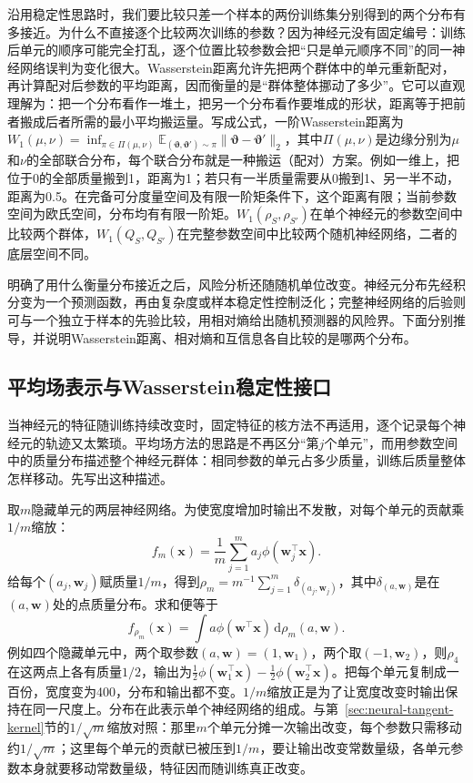 沿用稳定性思路时，我们要比较只差一个样本的两份训练集分别得到的两个分布有多接近。为什么不直接逐个比较两次训练的参数？因为神经元没有固定编号：训练后单元的顺序可能完全打乱，逐个位置比较参数会把“只是单元顺序不同”的同一神经网络误判为变化很大。Wasserstein距离允许先把两个群体中的单元重新配对，再计算配对后参数的平均距离，因而衡量的是“群体整体挪动了多少”。它可以直观理解为：把一个分布看作一堆土，把另一个分布看作要堆成的形状，距离等于把前者搬成后者所需的最小平均搬运量。写成公式，一阶Wasserstein距离为$W_1(\mu,\nu)=\inf_{\pi\in\Pi(\mu,\nu)}\mathbb E_{(\bm\vartheta,\bm\vartheta')\sim\pi}\|\bm\vartheta-\bm\vartheta'\|_2$，其中$\Pi(\mu,\nu)$是边缘分别为$\mu$和$\nu$的全部联合分布，每个联合分布就是一种搬运（配对）方案。例如一维上，把位于0的全部质量搬到1，距离为1；若只有一半质量需要从0搬到1、另一半不动，距离为0.5。在完备可分度量空间及有限一阶矩条件下，这个距离有限；当前参数空间为欧氏空间，分布均有有限一阶矩。$W_1(\rho_S,\rho_{S'})$在单个神经元的参数空间中比较两个群体，$W_1(Q_S,Q_{S'})$在完整参数空间中比较两个随机神经网络，二者的底层空间不同。

明确了用什么衡量分布接近之后，风险分析还随随机单位改变。神经元分布先经积分变为一个预测函数，再由复杂度或样本稳定性控制泛化；完整神经网络的后验则可与一个独立于样本的先验比较，用相对熵给出随机预测器的风险界。下面分别推导，并说明Wasserstein距离、相对熵和互信息各自比较的是哪两个分布。

\subsection{平均场表示与Wasserstein稳定性接口}

当神经元的特征随训练持续改变时，固定特征的核方法不再适用，逐个记录每个神经元的轨迹又太繁琐。平均场方法的思路是不再区分“第$j$个单元”，而用参数空间中的质量分布描述整个神经元群体：相同参数的单元占多少质量，训练后质量整体怎样移动。先写出这种描述。

取$m$隐藏单元的两层神经网络。为使宽度增加时输出不发散，对每个单元的贡献乘$1/m$缩放：
\[
 f_m(\bm x)=\frac1m\sum_{j=1}^m a_j\phi(\bm w_j^\top\bm x).
\]
给每个$(a_j,\bm w_j)$赋质量$1/m$，得到$\rho_m=m^{-1}\sum_{j=1}^m\delta_{(a_j,\bm w_j)}$，其中$\delta_{(a,\bm w)}$是在$(a,\bm w)$处的点质量分布。求和便等于
\begin{equation}
 f_{\rho_m}(\bm x)=\int a\phi(\bm w^\top\bm x)\,\mathrm d\rho_m(a,\bm w).
 \label{eq:mean-field-network}
\end{equation}
例如四个隐藏单元中，两个取参数$(a,\bm w)=(1,\bm w_1)$，两个取$(-1,\bm w_2)$，则$\rho_4$在这两点上各有质量$1/2$，输出为$\tfrac12\phi(\bm w_1^\top\bm x)-\tfrac12\phi(\bm w_2^\top\bm x)$。把每个单元复制成一百份，宽度变为400，分布和输出都不变。$1/m$缩放正是为了让宽度改变时输出保持在同一尺度上。分布在此表示单个神经网络的组成。与第~\ref{sec:neural-tangent-kernel}节的$1/\sqrt m$缩放对照：那里$m$个单元分摊一次输出改变，每个参数只需移动约$1/\sqrt m$；这里每个单元的贡献已被压到$1/m$，要让输出改变常数量级，各单元参数本身就要移动常数量级，特征因而随训练真正改变。

